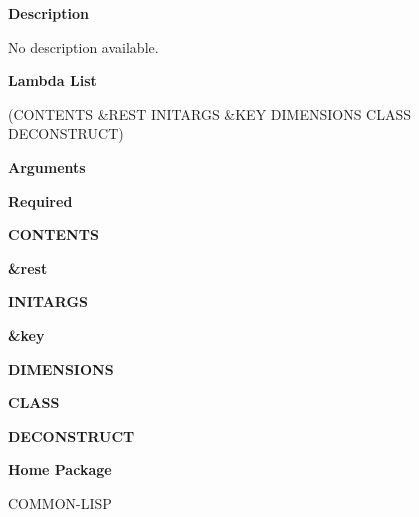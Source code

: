  
{\bf Description}

No description available.

 
{\bf Lambda List}

(CONTENTS \&REST INITARGS \&KEY DIMENSIONS CLASS DECONSTRUCT)

 
{\bf Arguments}


\beginhang
{\bf Required}\hspace{2em}
 
{\bf CONTENTS}


 
\endhang
\beginhang
{\bf \&rest}\hspace{2em}
 
{\bf INITARGS}


 
\endhang
\beginhang
{\bf \&key}\hspace{2em}
 
{\bf DIMENSIONS}


 
{\bf CLASS}


 
{\bf DECONSTRUCT}


 
\endhang
 
{\bf Home Package}

COMMON-LISP

